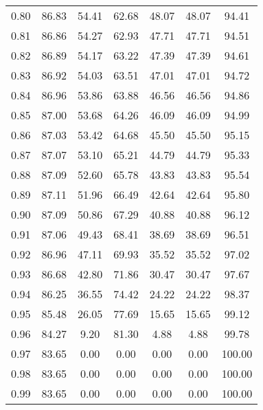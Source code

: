 \begin{tabular}{|c|c|c|c|c|c|c|}
      0.80 &     86.83 &     54.41 &      62.68 &   48.07 &      48.07 &         94.41 \\
      0.81 &     86.86 &     54.27 &      62.93 &   47.71 &      47.71 &         94.51 \\
      0.82 &     86.89 &     54.17 &      63.22 &   47.39 &      47.39 &         94.61 \\
      0.83 &     86.92 &     54.03 &      63.51 &   47.01 &      47.01 &         94.72 \\
      0.84 &     86.96 &     53.86 &      63.88 &   46.56 &      46.56 &         94.86 \\
      0.85 &     87.00 &     53.68 &      64.26 &   46.09 &      46.09 &         94.99 \\
      0.86 &     87.03 &     53.42 &      64.68 &   45.50 &      45.50 &         95.15 \\
      0.87 &     87.07 &     53.10 &      65.21 &   44.79 &      44.79 &         95.33 \\
      0.88 &     87.09 &     52.60 &      65.78 &   43.83 &      43.83 &         95.54 \\
      0.89 &     87.11 &     51.96 &      66.49 &   42.64 &      42.64 &         95.80 \\
      0.90 &     87.09 &     50.86 &      67.29 &   40.88 &      40.88 &         96.12 \\
      0.91 &     87.06 &     49.43 &      68.41 &   38.69 &      38.69 &         96.51 \\
      0.92 &     86.96 &     47.11 &      69.93 &   35.52 &      35.52 &         97.02 \\
      0.93 &     86.68 &     42.80 &      71.86 &   30.47 &      30.47 &         97.67 \\
      0.94 &     86.25 &     36.55 &      74.42 &   24.22 &      24.22 &         98.37 \\
      0.95 &     85.48 &     26.05 &      77.69 &   15.65 &      15.65 &         99.12 \\
      0.96 &     84.27 &      9.20 &      81.30 &    4.88 &       4.88 &         99.78 \\
      0.97 &     83.65 &      0.00 &       0.00 &    0.00 &       0.00 &        100.00 \\
      0.98 &     83.65 &      0.00 &       0.00 &    0.00 &       0.00 &        100.00 \\
      0.99 &     83.65 &      0.00 &       0.00 &    0.00 &       0.00 &        100.00 \\
\bottomrule
\end{tabular}
